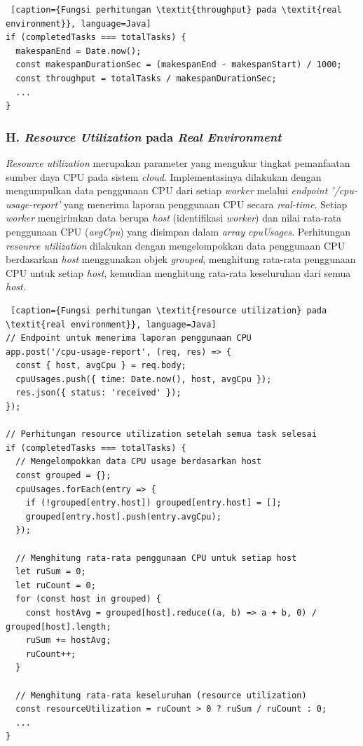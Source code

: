 \begin{lstlisting} [caption={Fungsi perhitungan \textit{throughput} pada \textit{real environment}}, language=Java]
if (completedTasks === totalTasks) {
  makespanEnd = Date.now();
  const makespanDurationSec = (makespanEnd - makespanStart) / 1000;
  const throughput = totalTasks / makespanDurationSec;
  ...
}
\end{lstlisting}

\subsubsection{H. \textit{Resource Utilization} pada \textit{Real Environment}}
\textit{Resource utilization} merupakan parameter yang mengukur tingkat pemanfaatan sumber daya CPU pada sistem \textit{cloud}. Implementasinya dilakukan dengan mengumpulkan data penggunaan CPU dari setiap \textit{worker} melalui \textit{endpoint '/cpu-usage-report'} yang menerima laporan penggunaan CPU secara \textit{real-time}. Setiap \textit{worker} mengirimkan data berupa \textit{host} (identifikasi \textit{worker}) dan nilai rata-rata penggunaan CPU (\textit{avgCpu}) yang disimpan dalam \textit{array cpuUsages}. Perhitungan \textit{resource utilization} dilakukan dengan mengelompokkan data penggunaan CPU berdasarkan \textit{host} menggunakan objek \textit{grouped}, menghitung rata-rata penggunaan CPU untuk setiap \textit{host}, kemudian menghitung rata-rata keseluruhan dari semua \textit{host}.

\begin{lstlisting} [caption={Fungsi perhitungan \textit{resource utilization} pada \textit{real environment}}, language=Java]
// Endpoint untuk menerima laporan penggunaan CPU
app.post('/cpu-usage-report', (req, res) => {
  const { host, avgCpu } = req.body;
  cpuUsages.push({ time: Date.now(), host, avgCpu });
  res.json({ status: 'received' });
});

// Perhitungan resource utilization setelah semua task selesai
if (completedTasks === totalTasks) {
  // Mengelompokkan data CPU usage berdasarkan host
  const grouped = {};
  cpuUsages.forEach(entry => {
    if (!grouped[entry.host]) grouped[entry.host] = [];
    grouped[entry.host].push(entry.avgCpu);
  });

  // Menghitung rata-rata penggunaan CPU untuk setiap host
  let ruSum = 0;
  let ruCount = 0;
  for (const host in grouped) {
    const hostAvg = grouped[host].reduce((a, b) => a + b, 0) / grouped[host].length;
    ruSum += hostAvg;
    ruCount++;
  }

  // Menghitung rata-rata keseluruhan (resource utilization)
  const resourceUtilization = ruCount > 0 ? ruSum / ruCount : 0;
  ...
}
\end{lstlisting}


